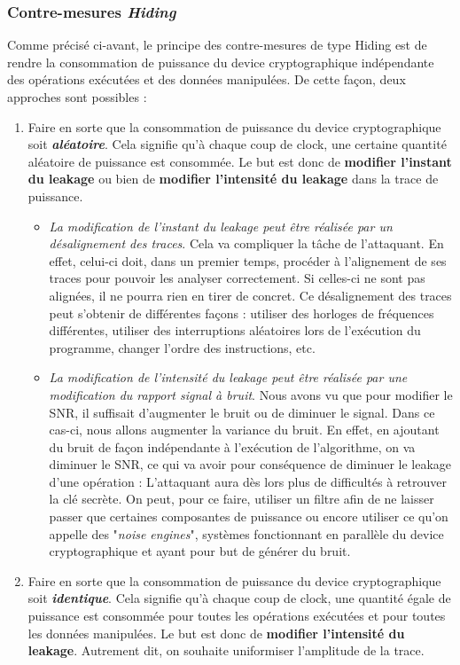 \documentclass[10pt, oneside, a4paper]{article}
\begin{document}
\subsubsection{Contre-mesures \textit{Hiding}}
\label{sec:hiding}
\vspace{-0.1 cm}Comme précisé ci-avant, le principe des contre-mesures de type Hiding est de rendre la consommation de puissance du device cryptographique indépendante des opérations exécutées et des données manipulées. De cette façon, deux approches sont possibles :
\begin{enumerate}
\item Faire en sorte que la consommation de puissance du device cryptographique soit \textbf{\textit{aléatoire}}. Cela signifie qu'à chaque coup de clock, une certaine quantité aléatoire de puissance est consommée. Le but est donc de \textbf{modifier l'instant du leakage} ou bien de \textbf{modifier l'intensité du leakage} dans la trace de puissance.
\begin{itemize}
\item \textit{La modification de l'instant du leakage peut être réalisée par un désalignement des traces}. Cela va compliquer la tâche de l'attaquant. En effet, celui-ci doit, dans un premier temps, procéder à l'alignement de ses traces pour pouvoir les analyser correctement. Si celles-ci ne sont pas alignées, il ne pourra rien en tirer de concret. Ce désalignement des traces peut s’obtenir de différentes façons : utiliser des horloges de fréquences différentes, utiliser des interruptions aléatoires lors de l’exécution du programme, changer l’ordre des instructions, etc.
\item \textit{La modification de l'intensité du leakage peut être réalisée par une modification du rapport signal à bruit}. Nous avons vu que pour modifier le SNR, il suffisait d'augmenter le bruit ou de diminuer le signal. Dans ce cas-ci, nous allons augmenter la variance du bruit. En effet, en ajoutant du bruit de façon indépendante à l'exécution de l'algorithme, on va diminuer le SNR, ce qui va avoir pour conséquence de diminuer le leakage d'une opération : L'attaquant aura dès lors plus de difficultés à retrouver la clé secrète. On peut, pour ce faire, utiliser un filtre afin de ne laisser passer que certaines composantes de puissance ou encore utiliser ce qu'on appelle des "\textit{noise engines}", systèmes fonctionnant en parallèle du device cryptographique et ayant pour but de générer du bruit.
\end{itemize}
\item Faire en sorte que la consommation de puissance du device cryptographique soit \textbf{\textit{identique}}. Cela signifie qu'à chaque coup de clock, une quantité égale de puissance est consommée pour toutes les opérations exécutées et pour toutes les données manipulées. Le but est donc de \textbf{modifier l'intensité du leakage}. Autrement dit, on souhaite uniformiser l'amplitude de la trace. 

\end{enumerate}
\end{document}
